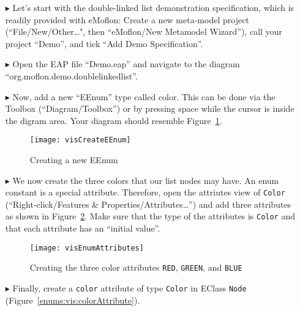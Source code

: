 \genHeader

\begin{itemize}

\item[$\blacktriangleright$]
Let's start with the double-linked list demonstration specification, which is
readily provided with eMoflon:
Create a new meta-model project (``File/New/Other\dots", then ``eMoflon/New
Metamodel Wizard''), call your project ``Demo'', and tick ``Add Demo
Specification''.

\item[$\blacktriangleright$]
Open the EAP file ``Demo.eap'' and navigate to the diagram
``org.\-moflon.\-demo.\-doublelinkedlist''.

\item[$\blacktriangleright$]
Now, add a new ``EEnum'' type called color.
This can be done via the Toolbox (``Diagram/Toolbox'') or by pressing space
while the cursor is inside the digram area.
Your diagram should resemble Figure~\ref{enums:vis:createEEnum}.

\begin{figure}[htbp]
    \begin{center} 
        \texttt{[image: visCreateEEnum]}
        \caption{Creating a new EEnum}  
        \label{enums:vis:createEEnum}
    \end{center}
\end{figure}

\item[$\blacktriangleright$]
We now create the three colors that our list nodes may have.
An enum constant is a special attribute.
Therefore, open the attriutes view of \texttt{Color} (``Right-click/Features \&
Properties/Attributes\dots'') and add three attributes as shown in
Figure~\ref{enums:vis:enumAttributes}.
Make sure that the type of the attributes is \texttt{Color} and that each
attribute has an ``initial value''.

\begin{figure}[htbp]
    \begin{center} 
        \texttt{[image: visEnumAttributes]}
        \caption{Creating the three color attributes \texttt{RED},
        \texttt{GREEN}, and \texttt{BLUE}}
        \label{enums:vis:enumAttributes}
    \end{center}
\end{figure}

\item[$\blacktriangleright$]
Finally, create a \texttt{color} attribute of type \texttt{Color} in EClass
\texttt{Node} (Figure~\ref{enums:vis:colorAttribute}).



\end{itemize}

